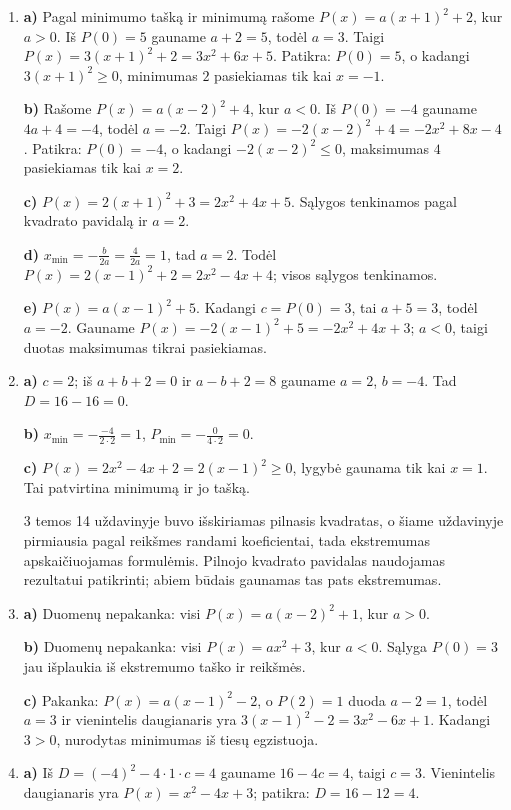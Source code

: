 \documentclass[12pt,a4paper]{article}
\begin{document}
\begin{enumerate}
\textbf{b)} $-x^2+2x+k=-(x-1)^2+k+1$, tad $P_{\max}=k+1=0$ ir $k=-1$.

\textbf{c)} $D=k^2-16$. Minimumas lygus nuliui tada ir tik tada, kai $D=0$, todėl $k=4$ arba $k=-4$.

\textbf{d)} Minimumui reikia $k>0$. Kadangi $x_{\min}=\frac{2}{2k}=\frac{1}{k}=1$, tai $k=1$, ir ši reikšmė tenkina $k>0$.
\item \textbf{a)} Pagal minimumo tašką ir minimumą rašome $P(x)=a(x+1)^2+2$, kur $a>0$. Iš $P(0)=5$ gauname $a+2=5$, todėl $a=3$. Taigi $P(x)=3(x+1)^2+2=3x^2+6x+5$. Patikra: $P(0)=5$, o kadangi $3(x+1)^2\ge0$, minimumas $2$ pasiekiamas tik kai $x=-1$.

\textbf{b)} Rašome $P(x)=a(x-2)^2+4$, kur $a<0$. Iš $P(0)=-4$ gauname $4a+4=-4$, todėl $a=-2$. Taigi $P(x)=-2(x-2)^2+4=-2x^2+8x-4$. Patikra: $P(0)=-4$, o kadangi $-2(x-2)^2\le0$, maksimumas $4$ pasiekiamas tik kai $x=2$.

\textbf{c)} $P(x)=2(x+1)^2+3=2x^2+4x+5$. Sąlygos tenkinamos pagal kvadrato pavidalą ir $a=2$.

\textbf{d)} $x_{\min}=-\frac b{2a}=\frac4{2a}=1$, tad $a=2$. Todėl $P(x)=2(x-1)^2+2=2x^2-4x+4$; visos sąlygos tenkinamos.

\textbf{e)} $P(x)=a(x-1)^2+5$. Kadangi $c=P(0)=3$, tai $a+5=3$, todėl $a=-2$. Gauname $P(x)=-2(x-1)^2+5=-2x^2+4x+3$; $a<0$, taigi duotas maksimumas tikrai pasiekiamas.
\item \textbf{a)} $c=2$; iš $a+b+2=0$ ir $a-b+2=8$ gauname $a=2$, $b=-4$. Tad $D=16-16=0$.

\textbf{b)} $x_{\min}=-\frac{-4}{2\cdot2}=1$, $P_{\min}=-\frac0{4\cdot2}=0$.

\textbf{c)} $P(x)=2x^2-4x+2=2(x-1)^2\ge0$, lygybė gaunama tik kai $x=1$. Tai patvirtina minimumą ir jo tašką.

3 temos 14 uždavinyje buvo išskiriamas pilnasis kvadratas, o šiame uždavinyje pirmiausia pagal reikšmes randami koeficientai, tada ekstremumas apskaičiuojamas formulėmis. Pilnojo kvadrato pavidalas naudojamas rezultatui patikrinti; abiem būdais gaunamas tas pats ekstremumas.
\item \textbf{a)} Duomenų nepakanka: visi $P(x)=a(x-2)^2+1$, kur $a>0$.

\textbf{b)} Duomenų nepakanka: visi $P(x)=ax^2+3$, kur $a<0$. Sąlyga $P(0)=3$ jau išplaukia iš ekstremumo taško ir reikšmės.

\textbf{c)} Pakanka: $P(x)=a(x-1)^2-2$, o $P(2)=1$ duoda $a-2=1$, todėl $a=3$ ir vienintelis daugianaris yra $3(x-1)^2-2=3x^2-6x+1$. Kadangi $3>0$, nurodytas minimumas iš tiesų egzistuoja.
\item \textbf{a)} Iš $D=(-4)^2-4\cdot1\cdot c=4$ gauname $16-4c=4$, taigi $c=3$. Vienintelis daugianaris yra $P(x)=x^2-4x+3$; patikra: $D=16-12=4$.


\end{enumerate}
\end{document}
